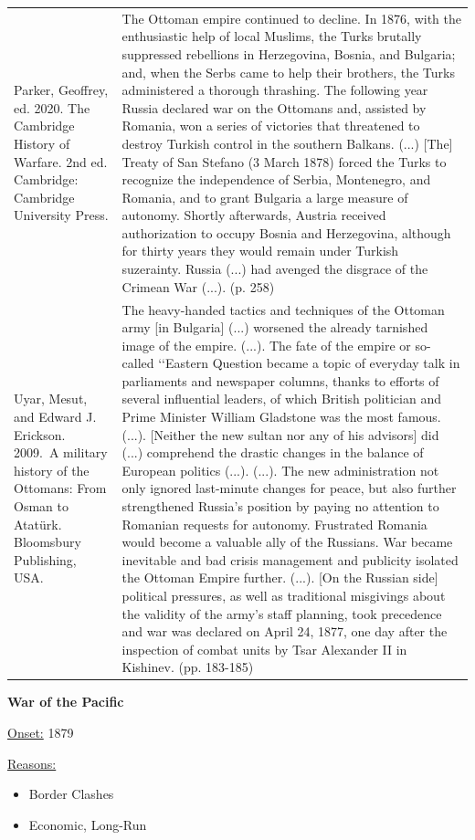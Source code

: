 {\begin{longtable}{p{}p{}}
Parker, Geoffrey, ed. 2020. The Cambridge History of Warfare. 2nd ed. Cambridge: Cambridge University Press. & The Ottoman empire continued to decline. In 1876, with the enthusiastic help of local Muslims, the Turks brutally suppressed rebellions in Herzegovina, Bosnia, and Bulgaria; and, when the Serbs came to help their brothers, the Turks administered a thorough thrashing. The following year Russia declared war on the Ottomans and, assisted by Romania, won a series of victories that threatened to destroy Turkish control in the southern Balkans. (...) [The] Treaty of San Stefano (3 March 1878) forced the Turks to recognize the independence of Serbia, Montenegro, and Romania, and to grant Bulgaria a large measure of autonomy. Shortly afterwards, Austria received authorization to occupy Bosnia and Herzegovina, although for thirty years they would remain under Turkish suzerainty. Russia (...) had avenged the disgrace of the Crimean War (...). (p. 258)
\\
Uyar, Mesut, and Edward J. Erickson. 2009. A military history of the Ottomans: From Osman to Atatürk. Bloomsbury Publishing, USA.  & The heavy-handed tactics and techniques of the Ottoman army [in Bulgaria] (...) worsened the already tarnished image of the empire. (...). The fate of the empire or so-called ‘‘Eastern Question became a topic of everyday talk in parliaments and newspaper columns, thanks to efforts of several influential leaders, of which British politician and Prime Minister William Gladstone was the most famous. (...). [Neither the new sultan nor any of his advisors] did (...) comprehend the drastic changes in the balance of European politics (...). (...). The new administration not only ignored last-minute changes for peace, but also further strengthened Russia's position by paying no attention to Romanian requests for autonomy. Frustrated Romania would become a valuable ally of the Russians. War became inevitable and bad crisis management and publicity isolated the Ottoman Empire further. (...).
[On the Russian side] political pressures, as well as traditional misgivings about the validity of the army's staff planning, took precedence and war was declared on April 24, 1877, one day after the inspection of combat units by Tsar Alexander II in Kishinev. (pp. 183-185)
\\
\end{longtable}}
\clearpage
         \textbf{War of the Pacific} 

          \underline{Onset:} 1879         

\underline{Reasons:}
\begin{itemize}
\item Border Clashes
\item Economic, Long-Run
\end{itemize}

